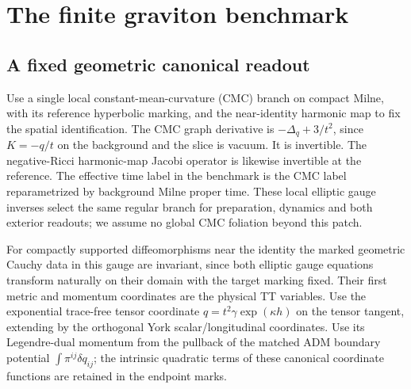 \section{The finite graviton benchmark}\label{sec:benchmark}

\subsection{A fixed geometric canonical readout}

Use a single local constant-mean-curvature (CMC) branch on compact Milne, with its reference hyperbolic marking, and the near-identity harmonic map to fix the spatial identification. The CMC graph derivative is \(-\Delta_q+3/t^2\), since \(K=-q/t\) on the background and the slice is vacuum. It is invertible. The negative-Ricci harmonic-map Jacobi operator is likewise invertible at the reference. The effective time label in the benchmark is the CMC label reparametrized by background Milne proper time. These local elliptic gauge inverses select the same regular branch for preparation, dynamics and both exterior readouts; we assume no global CMC foliation beyond this patch.

For compactly supported diffeomorphisms near the identity the marked geometric Cauchy data in this gauge are invariant, since both elliptic gauge equations transform naturally on their domain with the target marking fixed. Their first metric and momentum coordinates are the physical TT variables. Use the exponential trace-free tensor coordinate \(q=t^2\gamma\exp(\kappa h)\) on the tensor tangent, extending by the orthogonal York scalar/longitudinal coordinates. Use its Legendre-dual momentum from the pullback of the matched ADM boundary potential \(\int\pi^{ij}\delta q_{ij}\); the intrinsic quadratic terms of these canonical coordinate functions are retained in the endpoint marks.

